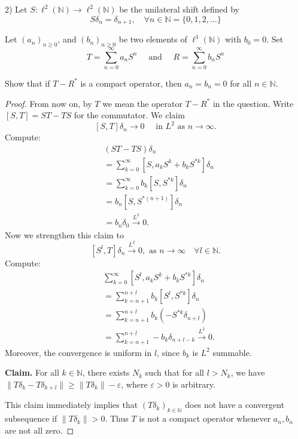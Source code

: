 \begin{problem}
	2) Let $S: \ell^2(\mathbb{N}) \rightarrow \ell^2(\mathbb{N})$ be the unilateral shift defined by
\[
S \delta_n=\delta_{n+1}, \quad \forall n \in \mathbb{N}=\{0,1,2, \ldots\}
\]

Let $\left(a_n\right)_{n \geq 0}$, and $\left(b_n\right)_{n \geq 0}$ be two elements of $\ell^1(\mathbb{N})$ with $b_0=0$. Set
\[
T=\sum_{n=0}^{\infty} a_n S^n \quad \text { and } \quad R=\sum_{n=0}^{\infty} b_n S^n
\]

Show that if $T-R^*$ is a compact operator, then $a_n=b_n=0$ for all $n \in \mathbb{N}$.
\end{problem}
\begin{proof}
	From now on, by $T$ we mean the operator $T - R^*$ in the question. 
	Write $[S,T] = ST - TS$ for the commutator. We claim
	\[
		[S, T] \delta_n \to 0 \quad \text{ in }L^2 \text{ as } n \to \infty  
	.\] 
Compute:
\begin{align*}
		& (ST - TS) \delta_n \\
		&= \sum_{k = 0}^\infty [S, a_k S^k + b_k S^{* k}] \delta_n \\
		&= \sum_{k=0}^{\infty} b_k [S, S^{*k}] \delta_n \\
		&= b_n [S, S^{*(n + 1)}] \delta_n \\
		&= b_n \delta_0  \xrightarrow{L^2} 0
.\end{align*}
Now we strengthen this claim to
\[
	[S^l, T] \delta_n \xrightarrow{L^2} 0, \text{ as $n \to \infty $} \quad \forall l \in \mathbb{N}
.\] 
Compute:
\begin{align*}
	&\sum_{k=0}^{\infty} [S^l, a_k S^k + b_k S^{* k}] \delta_n\\
	&= \sum_{k=n+1}^{n+l} b_k [S^l, S^{* k}] \delta_n \\
	&= \sum_{k=n+1}^{n+l} b_k (- S^{* k} \delta_{n + l})\\
	&= \sum_{k=n+1}^{n+l} - b_k \delta_{n + l - k} \xrightarrow{L^2} 0
.\end{align*}
Moreover, the convergence is uniform in $l$, since $b_k$ is $L^2$ summable.

\textbf{Claim. } For all $k \in \mathbb{N}$, there exists $N_k$ such that for all $l > N_k$, we have $\|T \delta_k - T \delta_{k + l}\| \ge \|T \delta_k\| - \varepsilon$, where $\varepsilon>0$ is arbitrary.

This claim immediately implies that $\left( T \delta_k \right) _{k \in \mathbb{N}}$ does not have a convergent subsequence if $\|T \delta_k\| > 0$. Thus $T$ is not a compact operator whenever $a_n, b_n$ are not all zero.


\end{proof}
